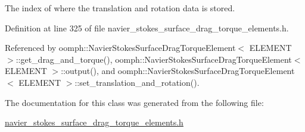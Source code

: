 The index of where the translation and rotation data is stored. 



Definition at line 325 of file navier\+\_\+stokes\+\_\+surface\+\_\+drag\+\_\+torque\+\_\+elements.\+h.



Referenced by oomph\+::\+Navier\+Stokes\+Surface\+Drag\+Torque\+Element$<$ E\+L\+E\+M\+E\+N\+T $>$\+::get\+\_\+drag\+\_\+and\+\_\+torque(), oomph\+::\+Navier\+Stokes\+Surface\+Drag\+Torque\+Element$<$ E\+L\+E\+M\+E\+N\+T $>$\+::output(), and oomph\+::\+Navier\+Stokes\+Surface\+Drag\+Torque\+Element$<$ E\+L\+E\+M\+E\+N\+T $>$\+::set\+\_\+translation\+\_\+and\+\_\+rotation().



The documentation for this class was generated from the following file\+:\begin{DoxyCompactItemize}
\item 
\hyperlink{navier__stokes__surface__drag__torque__elements_8h}{navier\+\_\+stokes\+\_\+surface\+\_\+drag\+\_\+torque\+\_\+elements.\+h}\end{DoxyCompactItemize}
